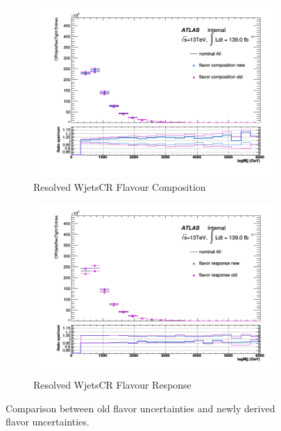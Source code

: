 \begin{figure}[ht]
    \bigskip %

    \begin{subfigure}[b]{0.4\textwidth}
        \centering
        \includegraphics[width=\textwidth]{figures/1lep/FlavorVar/SystFCompCRVjetsResTight_All_tagMjj.png}
        \caption{Resolved WjetsCR Flavour Composition}
        \label{fig:ResolvedWjetsCRFlavourComposition}
    \end{subfigure}
    \quad %
    \begin{subfigure}[b]{0.4\textwidth}
        \centering
        \includegraphics[width=\textwidth]{figures/1lep/FlavorVar/SystFResCRVjetsResTight_All_tagMjj.png}
        \caption{Resolved WjetsCR Flavour Response}
        \label{fig:ResolvedWjetsCRFlavourResponse}
    \end{subfigure}

    \caption{Comparison between old flavor uncertainties and newly derived flavor uncertainties.}
    \label{fig:1LepFlavorVarOldNew}
\end{figure}


